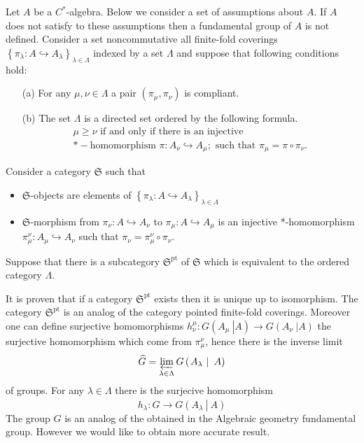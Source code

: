 \documentclass{beamer}
\theoremstyle{plain}
\newcommand{\be}{\begin{equation}}
\newcommand{\ee}{\end{equation}}
\newcommand{\la}{\lambda}
\newcommand{\La}{\Lambda}
\newcommand{\hookto}{\hookrightarrow}        %
\begin{document}
\begin{frame}
Let $A$ be a $C^*$-algebra. Below we consider a set of assumptions about $A$. If $A$ does not satisfy to these assumptions then a fundamental group of $A$ is not defined. Consider a set noncommutative all finite-fold coverings $\left\{ \pi_{\la}:A \hookto A_{\la}\right\}_{\la \in \La}$ indexed by a set  $\La$ and suppose that  following conditions hold:
\begin{enumerate}
	\item[(a)] For any $\mu, \nu \in \La$ a pair $\left( \pi_\mu, \pi_\nu\right)$ is compliant.
	\item [(b)]
The set	$\La$ is a directed set ordered by the following formula.
	\be\label{fg_ord_eqn}
	\begin{split}
		\mu \ge \nu  \text{ if and only if there is an injective}\\ *-\text{homomorphism } \pi: A_\nu \hookto A_\mu; 
		\text{ such that } \pi_\mu = \pi \circ \pi_\nu.
	\end{split}
	\ee
\end{enumerate}
Consider a category $\mathfrak{S}$ such that
\begin{itemize}
	\item $\mathfrak{S}$-objects are elements of $\left\{ \pi_{\la}:A \hookto A_{\la}\right\}_{\la \in \La}$
	\item $\mathfrak{S}$-morphism from $ \pi_\nu: A \hookto A_{\nu}$ to $ \pi_\mu: A \hookto A_\mu$ is an injective *-homomorphism $\pi^\nu_\mu : A_\mu \hookto  A_\nu$ such that $\pi_\nu = \pi^{\nu}_\mu \circ \pi_\nu$. 
\end{itemize}
Suppose that there is a subcategory $\mathfrak{S}^{\text{pt}}$ of  $\mathfrak{S}$   which is equivalent to the ordered category $\La$. 
\end{frame}
\begin{frame}
	It is proven that if a category $\mathfrak{S}^{\text{pt}}$ exists then it is unique up to isomorphism. The category $\mathfrak{S}^{\text{pt}}$ is an analog of the category pointed finite-fold coverings. Moreover  one can define surjective homomorphisms  $h^\mu_\nu:  G\left(\left.A_\mu~\right|A \right) \to  G\left(\left.A_\nu~\right|A \right)$ the surjective homomorphism which come from $\pi^\nu_\mu$, hence there is the inverse limit 
	$$
	\widehat{G}=	\varprojlim_{\la \in \La} G\left(\left.A_\la~\right|~A\right)
	$$
	of groups. For any $\la \in \La$ there is the surjecive homomorphism 
	\be\label{h_la_eqn}
	h_\la:\widehat{G}\to G\left(\left.A_\la~\right|~A\right)
	\ee
	The group $\widehat{G}$ is an analog of the obtained in the Algebraic geometry fundamental group. However we would like to obtain more accurate result.
\end{frame}
\end{document}
